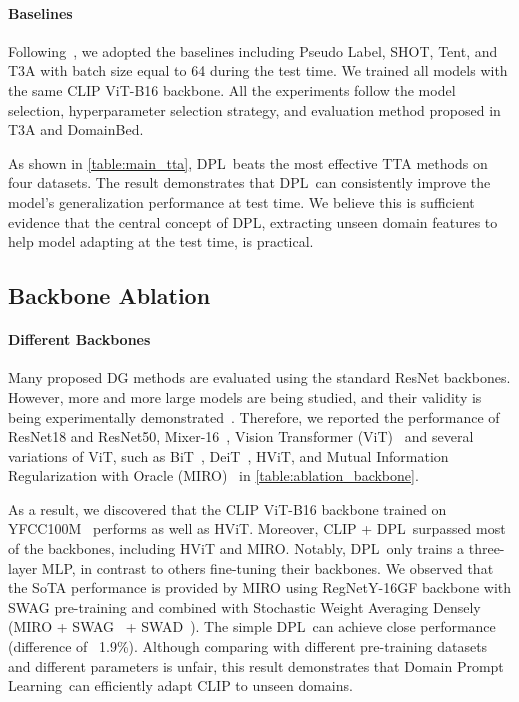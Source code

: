 \documentclass[letterpaper]{article} \usepackage[]{aaai23}
\newcommand{\dplshort}{DPL}
\newcommand{\dpllong}{Domain Prompt Learning}
\begin{document}
\paragraph{Baselines}

Following~\cite{iwasawa2021testtime}, we adopted the baselines including Pseudo Label, SHOT, Tent, and T3A with batch size equal to 64 during the test time.
We trained all models with the same CLIP ViT-B16 backbone.
All the experiments follow the model selection, hyperparameter selection strategy, and evaluation method proposed in T3A and DomainBed.

As shown in \autoref{table:main_tta}, \dplshort~beats the most effective TTA methods on four datasets.
The result demonstrates that \dplshort~can consistently improve the model's generalization performance at test time.
We believe this is sufficient evidence that the central concept of \dplshort, extracting unseen domain features to help model adapting at the test time, is practical.

\subsection{Backbone Ablation}
\paragraph{Different Backbones} 
Many proposed DG methods are evaluated using the standard ResNet backbones.
However, more and more large models are being studied, and their validity is being experimentally demonstrated~\cite{bommasani2021opportunities,wang2022deepnet}.
Therefore, we reported the performance of ResNet18 and ResNet50, Mixer-16~\cite{tolstikhin2021mlpmixer}, Vision Transformer (ViT)~\cite{dosovitskiy2020image} and several variations of ViT, such as BiT~\cite{kolesnikov2020big}, DeiT~\cite{touvron2021training}, HViT, and Mutual Information Regularization with Oracle (MIRO)~\cite{cha2022domain} in \autoref{table:ablation_backbone}.

As a result, we discovered that the CLIP ViT-B16 backbone trained on YFCC100M~\cite{thomee2016yfcc100m} performs as well as HViT.
Moreover, CLIP + \dplshort~surpassed most of the backbones, including HViT and MIRO.
Notably, \dplshort~only trains a three-layer MLP, in contrast to others fine-tuning their backbones.
We observed that the SoTA performance is provided by MIRO using RegNetY-16GF backbone with SWAG pre-training and combined with Stochastic Weight Averaging Densely (MIRO + SWAG~\cite{singh2022revisiting} + SWAD~\cite{cha2021swad}).
The simple \dplshort~can achieve close performance (difference of ~1.9\%).
Although comparing with different pre-training datasets and different parameters is unfair, this result demonstrates that \dpllong~can efficiently adapt CLIP to unseen domains.
\end{document}
